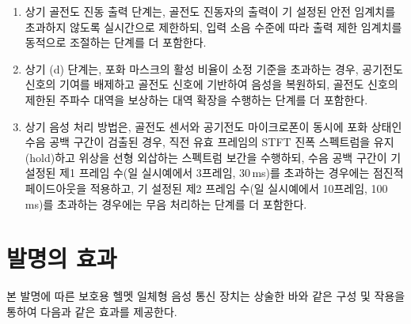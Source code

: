 \documentclass{article}
\begin{document}
\begin{enumerate}[label = \textbf{(M.2.\arabic*)}]
    \item 상기 골전도 진동 출력 단계는, 골전도 진동자의 출력이 기 설정된 안전 임계치를 초과하지 않도록 실시간으로 제한하되, 입력 소음 수준에 따라 출력 제한 임계치를 동적으로 조절하는 단계를 더 포함한다.

    \item 상기 (d) 단계는, 포화 마스크의 활성 비율이 
    소정 기준을 초과하는 경우, 공기전도 신호의 기여를 
    배제하고 골전도 신호에 기반하여 음성을 복원하되, 
    골전도 신호의 제한된 주파수 대역을 보상하는 대역 
    확장을 수행하는 단계를 더 포함한다.

    \item 상기 음성 처리 방법은, 골전도 센서와 
    공기전도 마이크로폰이 동시에 포화 상태인 수음 
    공백 구간이 검출된 경우, 직전 유효 프레임의 
    STFT 진폭 스펙트럼을 유지(hold)하고 위상을 선형 외삽하는 스펙트럼 보간을 수행하되, 수음 공백 구간이 기 설정된 제1 프레임 수(일 실시예에서 3프레임, 30\,ms)를 초과하는 경우에는 점진적 페이드아웃을 적용하고, 기 설정된 제2 프레임 수(일 실시예에서 10프레임, 100\,ms)를 초과하는 경우에는 무음 처리하는 
    단계를 더 포함한다.

\end{enumerate}

\section{발명의 효과}

본 발명에 따른 보호용 헬멧 일체형 음성 통신 장치는 상술한 바와 같은 
구성 및 작용을 통하여 다음과 같은 효과를 제공한다.
\end{document}
